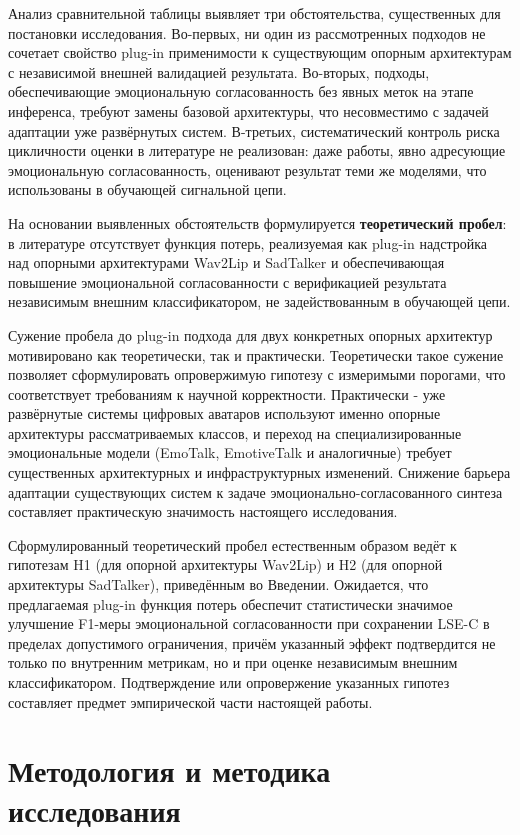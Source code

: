 \documentclass[a4paper, 12pt, oneside, openany]{article}
\begin{document}
Анализ сравнительной таблицы выявляет три обстоятельства, существенных для постановки исследования. Во-первых, ни один из рассмотренных подходов не сочетает свойство plug-in применимости к существующим опорным архитектурам с независимой внешней валидацией результата. Во-вторых, подходы, обеспечивающие эмоциональную согласованность без явных меток на этапе инференса, требуют замены базовой архитектуры, что несовместимо с задачей адаптации уже развёрнутых систем. В-третьих, систематический контроль риска цикличности оценки в литературе не реализован: даже работы, явно адресующие эмоциональную согласованность, оценивают результат теми же моделями, что использованы в обучающей сигнальной цепи.

На основании выявленных обстоятельств формулируется \textbf{теоретический пробел}: в литературе отсутствует функция потерь, реализуемая как plug-in надстройка над опорными архитектурами Wav2Lip и SadTalker и обеспечивающая повышение эмоциональной согласованности с верификацией результата независимым внешним классификатором, не задействованным в обучающей цепи.

Сужение пробела до plug-in подхода для двух конкретных опорных архитектур мотивировано как теоретически, так и практически. Теоретически такое сужение позволяет сформулировать опровержимую гипотезу с измеримыми порогами, что соответствует требованиям к научной корректности. Практически - уже развёрнутые системы цифровых аватаров используют именно опорные архитектуры рассматриваемых классов, и переход на специализированные эмоциональные модели (EmoTalk, EmotiveTalk и аналогичные) требует существенных архитектурных и инфраструктурных изменений. Снижение барьера адаптации существующих систем к задаче эмоционально-согласованного синтеза составляет практическую значимость настоящего исследования.

Сформулированный теоретический пробел естественным образом ведёт к гипотезам H1 (для опорной архитектуры Wav2Lip) и H2 (для опорной архитектуры SadTalker), приведённым во Введении. Ожидается, что предлагаемая plug-in функция потерь обеспечит статистически значимое улучшение F1-меры эмоциональной согласованности при сохранении LSE-C в пределах допустимого ограничения, причём указанный эффект подтвердится не только по внутренним метрикам, но и при оценке независимым внешним классификатором. Подтверждение или опровержение указанных гипотез составляет предмет эмпирической части настоящей работы.


\section{Методология и методика исследования}
\end{document}
